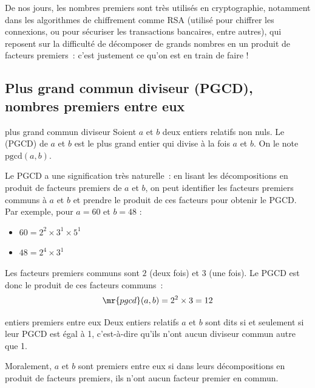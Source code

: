 \documentclass[12pt]{article}
\begin{document}
De nos jours, les nombres premiers sont très utilisés en cryptographie, notamment dans les algorithmes de chiffrement comme RSA (utilisé pour chiffrer les connexions, ou pour sécuriser les transactions bancaires, entre autres), qui reposent sur la difficulté de décomposer de grands nombres en un produit de facteurs premiers~: c'est justement ce qu'on est en train de faire !

\subsection{Plus grand commun diviseur (PGCD), nombres premiers entre eux}

\begin{definition}{}{plus grand commun diviseur}
    Soient \(a\) et \(b\) deux entiers relatifs non nuls. Le  (PGCD) de \(a\) et \(b\) est le plus grand entier qui divise à la fois \(a\) et \(b\). On le note \(\text{pgcd}(a, b)\).
\end{definition}

\begin{remarque}{}{}
    Le PGCD a une signification très naturelle~: en lisant les décompositions en produit de facteurs premiers de \(a\) et \(b\), on peut identifier les facteurs premiers communs à \(a\) et \(b\) et prendre le produit de ces facteurs pour obtenir le PGCD. Par exemple, pour \(a = 60\) et \(b = 48\) :
    \begin{itemize}
        \item \(60 = 2^2 \times 3^1 \times 5^1\)
        \item \(48 = 2^4 \times 3^1\)
    \end{itemize}
    Les facteurs premiers communs sont \(2\) (deux fois) et \(3\) (une fois). Le PGCD est donc le produit de ces facteurs communs~:
    $$\mr{pgcd}(a,b) = 2^2 \times 3 = 12$$
\end{remarque}

\begin{definition}{}{entiers premiers entre eux}
    Deux entiers relatifs \(a\) et \(b\) sont dits  si et seulement si leur PGCD est égal à 1, c'est-à-dire qu'ils n'ont aucun diviseur commun autre que 1.
\end{definition}

\begin{remarque}{}{}
    Moralement, $a$ et $b$ sont premiers entre eux si dans leurs décompositions en produit de facteurs premiers, ils n'ont aucun facteur premier en commun.
\end{remarque}
\end{document}
